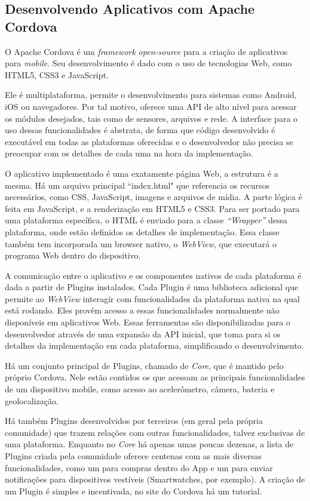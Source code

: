\documentclass[a4paper,12pt]{article}
\begin{document}
\subsection{Desenvolvendo Aplicativos com Apache Cordova}

O Apache Cordova é um \emph{framework} \emph{open-source} para a criação de aplicativos para \emph{mobile}. Seu desenvolvimento é dado com o uso de tecnologias Web, como HTML5, CSS3 e JavaScript.

Ele é multiplataforma, permite o desenvolvimento para sistemas como Android, iOS ou navegadores. Por tal motivo, oferece uma API de alto nível para acessar os módulos desejados, tais como de sensores, arquivos e rede. A interface para o uso dessas funcionalidades é abstrata, de forma que código desenvolvido é executável em todas as plataformas oferecidas e o desenvolvedor não precisa se preocupar com os detalhes de cada uma na hora da implementação.

O aplicativo implementado é uma exatamente página Web, a estrutura é a mesma. Há um arquivo principal “index.html" que referencia os recursos necessários, como CSS, JavaScript, imagens e arquivos de mídia. A parte lógica é feita em JavaScript, e a renderização em HTML5 e CSS3. Para ser portado para uma plataforma específica, o HTML é enviado para a classe \emph{“Wrapper”} dessa plataforma, onde estão definidos os detalhes de implementação. Essa classe também tem incorporada um browser nativo, o \emph{WebView}, que executará o programa Web dentro do dispositivo.

A comunicação entre o aplicativo e os componentes nativos de cada plataforma é dada a partir de Plugins instalados. Cada Plugin é uma biblioteca adicional que permite ao \emph{WebView} interagir com funcionalidades da plataforma nativa na qual está rodando. Eles provêm acesso a essas funcionalidades normalmente não disponíveis em aplicativos Web. Essas ferramentas são disponibilizadas para o desenvolvedor através de uma expansão da API inicial, que toma para si os detalhes da implementação em cada plataforma, simplificando o desenvolvimento.

Há um conjunto principal de Plugins, chamado de \emph{Core}, que é mantido pelo próprio Cordova. Nele estão contidos os que acessam as principais funcionalidades de um dispositivo mobile, como acesso ao acelerômetro, câmera, bateria e geolocalização.

Há também Plugins desenvolvidos por terceiros (em geral pela própria comunidade) que trazem relações com outras funcionalidades, talvez exclusivas de uma plataforma. Enquanto no \emph{Core} há apenas umas poucas dezenas, a lista de Plugins criada pela comunidade oferece centenas com as mais diversas funcionalidades, como um para compras dentro do App e um para enviar notificações para dispositivos vestíveis (Smartwatches, por exemplo). A criação de um Plugin é simples e incentivada, no site do Cordova há um tutorial.
\end{document}
